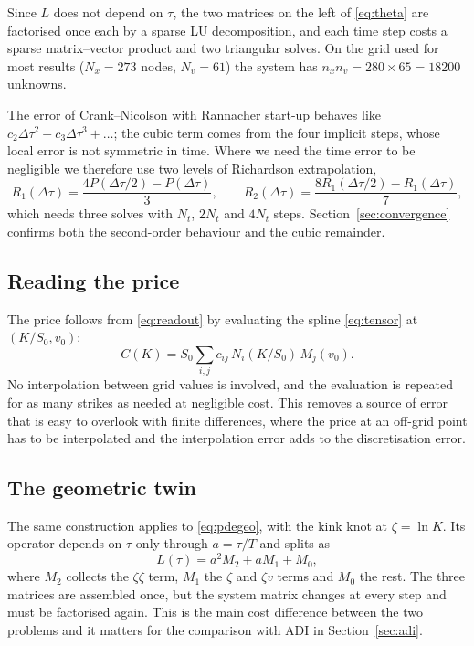 Since $L$ does not depend on $\tau$, the two matrices on the left of \eqref{eq:theta} are factorised once
each by a sparse LU decomposition, and each time step costs a sparse matrix--vector product and two
triangular solves. On the grid used for most results ($N_x=273$ nodes, $N_v=61$) the system has
$n_xn_v = 280\times65 = \num{18200}$ unknowns.

The error of Crank--Nicolson with Rannacher start-up behaves like
$c_2\Delta\tau^2 + c_3\Delta\tau^3 + \dots$; the cubic term comes from the four implicit steps, whose
local error is not symmetric in time. Where we need the time error to be negligible we therefore use two
levels of Richardson extrapolation,
\begin{equation}\label{eq:richardson}
R_1(\Delta\tau) = \frac{4P(\Delta\tau/2) - P(\Delta\tau)}{3},\qquad
R_2(\Delta\tau) = \frac{8R_1(\Delta\tau/2) - R_1(\Delta\tau)}{7},
\end{equation}
which needs three solves with $N_t$, $2N_t$ and $4N_t$ steps. Section~\ref{sec:convergence} confirms both
the second-order behaviour and the cubic remainder.

\subsection{Reading the price}

The price follows from \eqref{eq:readout} by evaluating the spline \eqref{eq:tensor} at
$(K/S_0, v_0)$:
\begin{equation*}
C(K) = S_0\sum_{i,j} c_{ij}\,N_i(K/S_0)\,M_j(v_0).
\end{equation*}
No interpolation between grid values is involved, and the evaluation is repeated for as many strikes as
needed at negligible cost. This removes a source of error that is easy to overlook with finite
differences, where the price at an off-grid point has to be interpolated and the interpolation error adds
to the discretisation error.

\subsection{The geometric twin}

The same construction applies to \eqref{eq:pdegeo}, with the kink knot at $\zeta=\ln K$. Its operator
depends on $\tau$ only through $a=\tau/T$ and splits as
\begin{equation*}
L(\tau) = a^2 M_2 + a M_1 + M_0 ,
\end{equation*}
where $M_2$ collects the $\zeta\zeta$ term, $M_1$ the $\zeta$ and $\zeta v$ terms and $M_0$ the rest. The
three matrices are assembled once, but the system matrix changes at every step and must be factorised
again. This is the main cost difference between the two problems and it matters for the comparison with
ADI in Section~\ref{sec:adi}.
